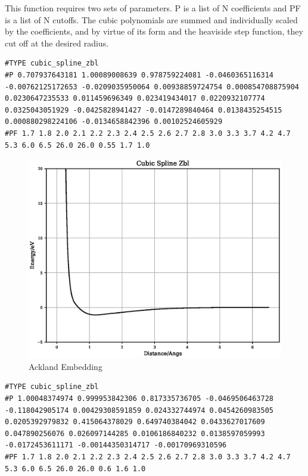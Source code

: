 This function requires two sets of parameters.  P is a list of N coefficients and PF is a list of N cutoffs.  The cubic polynomials are summed and individually scaled by the coefficients, and by virtue of its form and the heaviside step function, they cut off at the desired radius. 

\begin{lstlisting}[style=pseudocode,caption={Cubic Splines Plus ZBL}]
#TYPE cubic_spline_zbl
#P 0.707937643181 1.00089008639 0.978759224081 -0.0460365116314 -0.00762125172653 -0.0209035950064 0.00938859724754 0.000854708875904 0.0230647235533 0.011459696349 0.023419434017 0.0220932107774 0.0325043051929 -0.0425828941427 -0.0147289840464 0.0138435254515 0.000880298224106 -0.0134658842396 0.00102524605929 
#PF 1.7 1.8 2.0 2.1 2.2 2.3 2.4 2.5 2.6 2.7 2.8 3.0 3.3 3.7 4.2 4.7 5.3 6.0 6.5 26.0 26.0 0.55 1.7 1.0 
\end{lstlisting}

\FloatBarrier
\begin{figure}[h]
  \begin{center}
    \includegraphics[scale=0.5]{appendix/functions/plots/cubic_spline_zbl.eps}
    \caption{Ackland Embedding}
    \label{graph:graph1}
  \end{center}
\end{figure}
\FloatBarrier


\begin{lstlisting}[style=pseudocode,caption={Cubic Splines Plus ZBL}]
#TYPE cubic_spline_zbl
#P 1.00048374974 0.999953842306 0.817335736705 -0.0469506463728 -0.118042905174 0.00429308591859 0.024332744974 0.0454260983505 0.0205392979832 0.415064378029 0.649740384042 0.0433627017609 0.047890256076 0.026097144285 0.0106186840232 0.0138597059993 -0.0172453611171 -0.00144350314717 -0.00170969310596 
#PF 1.7 1.8 2.0 2.1 2.2 2.3 2.4 2.5 2.6 2.7 2.8 3.0 3.3 3.7 4.2 4.7 5.3 6.0 6.5 26.0 26.0 0.6 1.6 1.0  
\end{lstlisting}

